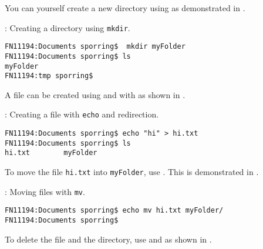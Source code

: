 You can yourself create a new directory using  as demonstrated in .
\begin{codeNOutput}[label=LinuxMkdir]{: Creating a directory using \lstinline[language=console]{mkdir}.}
  \begin{lstlisting}[language=console,escapechar=§]
FN11194:Documents sporring$  mkdir myFolder
FN11194:Documents sporring$ ls
myFolder
FN11194:tmp sporring$  
\end{lstlisting}%
\end{codeNOutput}
A file can be created using  and with  as shown in .
\begin{codeNOutput}[label=LinuxEcho]{: Creating a file with \lstinline[language=console]{echo} and redirection.}
  \begin{lstlisting}[language=console,escapechar=§]
FN11194:Documents sporring$ echo "hi" > hi.txt
FN11194:Documents sporring$ ls
hi.txt        myFolder
\end{lstlisting}
\end{codeNOutput}
To move the file \lstinline[language=console]{hi.txt} into \lstinline[language=console]{myFolder}, use . This is demonstrated in .
\begin{codeNOutput}[label=LinuxMv]{: Moving files with \lstinline[language=console]{mv}.}
  \begin{lstlisting}[language=console,escapechar=§]
FN11194:Documents sporring$ echo mv hi.txt myFolder/
FN11194:Documents sporring$ 
\end{lstlisting}
\end{codeNOutput}
To delete the file and the directory, use   and  as shown in .
